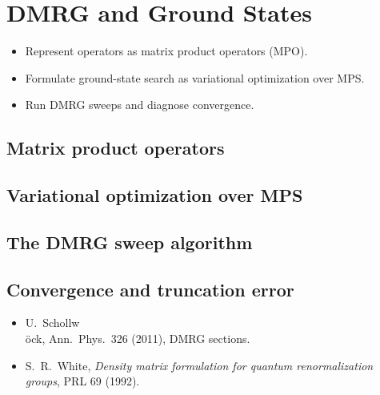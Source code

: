 \chapter{DMRG and Ground States}
\label{ch:lec16}

\begin{objectives}
\begin{itemize}[leftmargin=1.4em,nosep]
  \item Represent operators as matrix product operators (MPO).
  \item Formulate ground-state search as variational optimization over MPS.
  \item Run DMRG sweeps and diagnose convergence.
\end{itemize}
\end{objectives}


\section{Matrix product operators}
\label{sec:lec16-1}

\section{Variational optimization over MPS}
\label{sec:lec16-2}

\section{The DMRG sweep algorithm}
\label{sec:lec16-3}

\section{Convergence and truncation error}
\label{sec:lec16-4}

\exercisesection
\begin{exercise}
\end{exercise}
\begin{exercise}
\end{exercise}
\begin{exercise}
\end{exercise}

\readingsection
\begin{itemize}[leftmargin=1.4em]
  \item U.~Schollw\\\"ock, Ann.~Phys.~326 (2011), DMRG sections.
  \item S.~R.~White, \emph{Density matrix formulation for quantum renormalization groups}, PRL 69 (1992).
\end{itemize}
